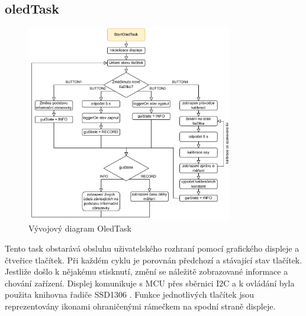 \subsection{oledTask}
\begin{figure}[h]
    \centering
    \includegraphics[width=0.8\textwidth]{obrazky/OledTask}
    \caption{Vývojový diagram OledTask}
\end{figure}
Tento task obstarává obsluhu uživatelského rozhraní pomocí grafického displeje a čtveřice tlačítek. Při každém cyklu
je porovnán předchozí a stávající stav tlačítek. Jestliže došlo k nějakému stisknutí, změní se náležitě zobrazované informace a chování zařízení. Displej komunikuje s \ac{MCU} přes sběrnici I2C a k ovládání byla použita knihovna řadiče SSD1306 \cite{Alekseev2024}. Funkce jednotlivých tlačítek jsou reprezentovány ikonami ohraničenými rámečkem na spodní straně displeje.

